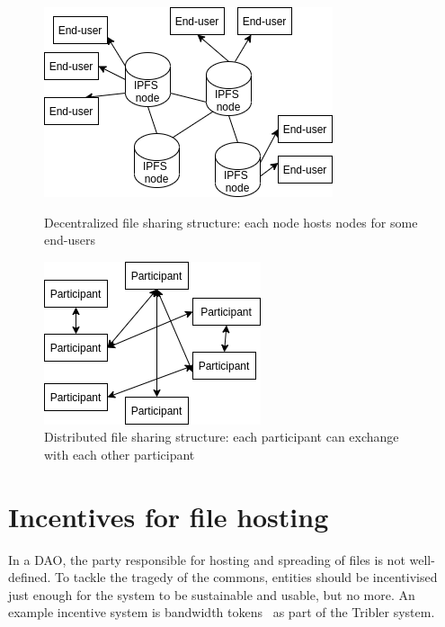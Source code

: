 \begin{figure}
        \includegraphics[width=1\linewidth]{related-work/decentralized-ipfs.png}
        \caption{Decentralized file sharing structure: each node hosts nodes for some end-users}
        \label{fig:decentralized}
    \endminipage\hfill
        \includegraphics[width=1\linewidth]{related-work/distributed-bittorrent.png}
        \caption{Distributed file sharing structure: each participant can exchange with each other participant}
        \label{fig:distributed}
    \endminipage
\end{figure}

\section{Incentives for file hosting}
\label{sec:file-spreading-incentives}
In a DAO, the party responsible for hosting and spreading of files is not well-defined. To tackle the tragedy of the commons, entities should be incentivised just enough for the system to be sustainable and usable, but no more. An example incentive system is bandwidth tokens~\citep{de2018blockchain} as part of the Tribler system.


